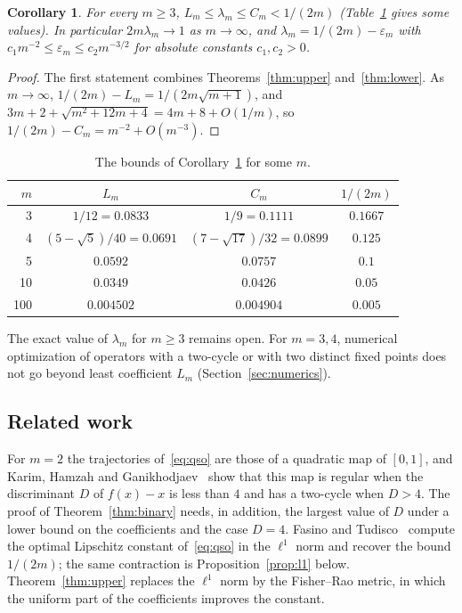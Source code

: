 \documentclass[11pt]{amsart}
\newtheorem{corollary}[theorem]{Corollary}
\theoremstyle{definition}
\theoremstyle{remark}
\begin{document}
\begin{corollary}\label{cor:asym}
For every $m\ge3$, $L_m\le\lambda_m\le C_m<1/(2m)$ (Table~\ref{tab:bounds} gives some values). In particular $2m\lambda_m\to1$ as $m\to\infty$, and
$\lambda_m=1/(2m)-\varepsilon_m$ with $c_1m^{-2}\le\varepsilon_m\le c_2m^{-3/2}$ for absolute constants
$c_1,c_2>0$.
\end{corollary}

\begin{proof}
The first statement combines Theorems~\ref{thm:upper} and~\ref{thm:lower}. As $m\to\infty$,
$1/(2m)-L_m=1/(2m\sqrt{m+1})$, and $3m+2+\sqrt{m^2+12m+4}=4m+8+O(1/m)$, so $1/(2m)-C_m=m^{-2}+O(m^{-3})$.
\end{proof}

\begin{table}[tbp]
\centering
\begin{tabular}{rccc}
\toprule
$m$ & $L_m$ & $C_m$ & $1/(2m)$\\
\midrule
3 & $1/12=0.0833$ & $1/9=0.1111$ & $0.1667$\\
4 & $(5-\sqrt5)/40=0.0691$ & $(7-\sqrt{17})/32=0.0899$ & $0.125$\\
5 & $0.0592$ & $0.0757$ & $0.1$\\
10 & $0.0349$ & $0.0426$ & $0.05$\\
100 & $0.004502$ & $0.004904$ & $0.005$\\
\bottomrule
\end{tabular}
\caption{The bounds of Corollary~\ref{cor:asym} for some $m$.}\label{tab:bounds}
\end{table}

The exact value of $\lambda_m$ for $m\ge3$ remains open. For $m=3,4$, numerical optimization of operators with a
two-cycle or with two distinct fixed points does not go beyond least coefficient $L_m$ (Section~\ref{sec:numerics}).

\subsection*{Related work}
For $m=2$ the trajectories of~\eqref{eq:qso} are those of a quadratic map of $[0,1]$, and Karim, Hamzah and
Ganikhodjaev~\cite[Theorem~3.1]{KHG22} show that this map is regular when the discriminant $D$ of $f(x)-x$ is less
than $4$ and has a two-cycle when $D>4$. The proof of Theorem~\ref{thm:binary} needs, in addition, the largest value
of $D$ under a lower bound on the coefficients and the case $D=4$. Fasino and Tudisco~\cite[Theorem~6.1 and
Corollary~6.2]{FT20} compute the optimal Lipschitz constant of~\eqref{eq:qso} in the $\ell^1$ norm and recover the bound
$1/(2m)$; the same contraction is Proposition~\ref{prop:l1} below. Theorem~\ref{thm:upper} replaces the $\ell^1$ norm
by the Fisher--Rao metric, in which the uniform part of the coefficients improves the constant.
\end{document}
